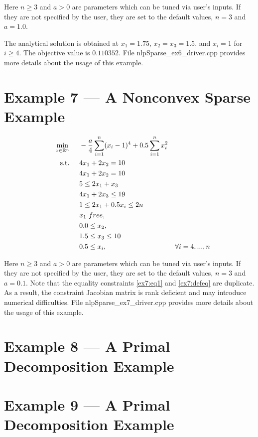 \documentclass[11pt,letterpaper]{article}
\begin{document}
Here $n\geq3$ and $a>0$ are parameters which can be tuned via user's inputs. If they are not specified by the user, they are set to the default values, $n=3$ and $a=1.0$.

The analytical solution is obtained at $x_1=1.75$, $x_2=x_3=1.5$, and $x_i=1$ for $i\geq 4$. The objective value is $0.110352$.
File nlpSparse\_ex6\_driver.cpp provides more details about the usage of this example.

\section{Example 7 --- A Nonconvex Sparse Example}
\begin{align}
    &&&&\min_{x\in\mathbb{R}^n} & \hspace{0.5cm} -\frac{a}{4}\sum_{i=1}^{n} (x_i-1)^4 + 0.5\sum_{i=1}^{n} x_i^2&&&& \label{ex7:obj}\\
    &&&&\textnormal{s.t.} &\hspace{0.5cm}  4x_1+2x_2 = 10 &&&& \label{ex7:eq1}\\
    &&&&& \hspace{0.5cm}  4x_1+2x_2 = 10 &&&& \label{ex7:defeq}\\
    &&&&& \hspace{0.5cm}  5 \leq  2x_1 + x_3                 &&&& \label{ex7:ineq1}\\
    &&&&& \hspace{0.5cm}          4x_1      + 2x_3   \leq 19 &&&& \label{ex7:defineq}\\
    &&&&& \hspace{0.5cm}  1 \leq  2x_1      + 0.5x_i \leq 2n &&&& \label{ex7:ineq2}\\
    &&&&& \hspace{0.5cm}  x_1~free, &&&& \label{ex7:varb1}\\
    &&&&& \hspace{0.5cm}  0.0 \leq x_2, &&&& \label{ex7:varb2}\\
    &&&&& \hspace{0.5cm}  1.5 \leq x_3 \leq 10  &&&& \label{ex7:varb3}\\
    &&&&& \hspace{0.5cm}  0.5 \leq x_i, &\forall i=4,...,n    &&& \label{ex7:varb4}
\end{align}

Here $n\geq3$ and $a>0$ are parameters which can be tuned via user's inputs. If they are not specified by the user, they are set to the default values, $n=3$ and $a=0.1$. Note that the equality constraints \eqref{ex7:eq1} and \eqref{ex7:defeq} are duplicate. As a result, the constraint Jacobian matrix is rank deficient and may introduce numerical difficulties. File nlpSparse\_ex7\_driver.cpp provides more details about the usage of this example.


\section{Example 8 --- A Primal Decomposition Example}
\section{Example 9 --- A Primal Decomposition Example}
\end{document}
